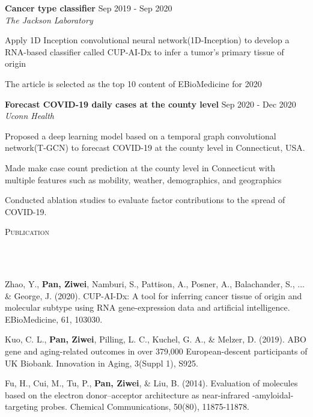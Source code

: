 \documentclass{article}
\newcommand{\header}[1]{{
\hspace*{-15pt}\vspace*{6pt} \textsc{#1}} \vspace*{-6pt} 
\lineunder
}
\newcommand{\lineunder}{
\vspace*{-8pt} \\ \hspace*{-18pt} 
\hrulefill \\
}
\newcommand{\project}[4]{{
\vspace*{2pt}%
\textbf{#1} #2 \hfill #3\\ \textit{#4} \vspace*{2pt}}
}
\renewcommand{\labelitemii}{
$\vcenter{\hbox{\tiny$\bullet$}}$\hspace*{-3pt}
}
\newenvironment{bullet-list-major}{
\begin{list}{\labelitemii}{\setlength\leftmargin{3pt} 
\topsep 0pt \itemsep -2pt}}{\vspace*{4pt}\end{list}
}
\newenvironment{bullet-list-minor}{
\begin{list}{\labelitemii}{\setlength\leftmargin{15pt} 
\topsep 0pt \itemsep -2pt}}{\vspace*{4pt}\end{list}
}
\begin{document}
    \project{Cancer type classifier}{}{Sep 2019 - Sep 2020}{The Jackson Laboratory}
	\begin{bullet-list-minor}
	\item Apply 1D Inception convolutional neural network(1D-Inception) to develop a RNA-based classifier called CUP-AI-Dx to infer a tumor's primary tissue of origin
	\item The article is selected as the top 10 content of EBioMedicine for 2020
    \end{bullet-list-minor}

    \project{Forecast COVID-19 daily cases at the county level}{}{Sep 2020 - Dec 2020}{Uconn Health}
	\begin{bullet-list-minor}
	\item Proposed a deep learning model based on a temporal graph convolutional network(T-GCN) to forecast COVID-19 at the county level in Connecticut, USA. 
	\item Made make case count prediction at the county level in Connecticut with multiple features such as mobility, weather, demographics, and geographics
	\item Conducted ablation studies to evaluate factor contributions to the spread of COVID-19.
    \end{bullet-list-minor}

\newpage

\vspace*{4pt}%
\header{Publication}
    \begin{bullet-list-major}
    \item Zhao, Y., \textbf{Pan, Ziwei}, Namburi, S., Pattison, A., Posner, A., Balachander, S., ... \& George, J. (2020). CUP-AI-Dx: A tool for inferring cancer tissue of origin and molecular subtype using RNA gene-expression data and artificial intelligence. EBioMedicine, 61, 103030.
    \vspace{2pt}
    \item Kuo, C. L., \textbf{Pan, Ziwei}, Pilling, L. C., Kuchel, G. A., \& Melzer, D. (2019). ABO gene and aging-related outcomes in over 379,000 European-descent participants of UK Biobank. Innovation in Aging, 3(Suppl 1), S925.
    \vspace{2pt}
    \item Fu, H., Cui, M., Tu, P., \textbf{Pan, Ziwei}, \& Liu, B. (2014). Evaluation of molecules based on the electron donor–acceptor architecture as near-infrared  \textbeta-amyloidal-targeting probes. Chemical Communications, 50(80), 11875-11878.
    \end{bullet-list-major}
\end{document}
